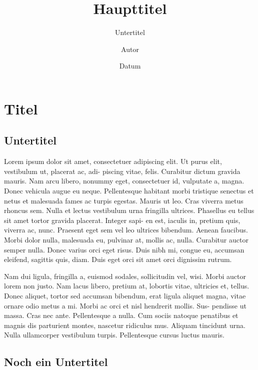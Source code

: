 \documentclass[ngerman]{uzhpub}
\begin{document}
\title{Haupttitel}

\subtitle{Untertitel}

\author{Autor}

\date{Datum}

\maketitle



\section{Titel}

\subsection{Untertitel}

Lorem ipsum dolor sit amet, consectetuer adipiscing elit. Ut purus
elit, vestibulum ut, placerat ac, adi- piscing vitae, felis. Curabitur
dictum gravida mauris. Nam arcu libero, nonummy eget, consectetuer
id, vulputate a, magna. Donec vehicula augue eu neque. Pellentesque
habitant morbi tristique senectus et netus et malesuada fames ac turpis
egestas. Mauris ut leo. Cras viverra metus rhoncus sem. Nulla et lectus
vestibulum urna fringilla ultrices. Phasellus eu tellus sit amet tortor
gravida placerat. Integer sapi- en est, iaculis in, pretium quis,
viverra ac, nunc. Praesent eget sem vel leo ultrices bibendum. Aenean
faucibus. Morbi dolor nulla, malesuada eu, pulvinar at, mollis ac,
nulla. Curabitur auctor semper nulla. Donec varius orci eget risus.
Duis nibh mi, congue eu, accumsan eleifend, sagittis quis, diam. Duis
eget orci sit amet orci dignissim rutrum. 

Nam dui ligula, fringilla a, euismod sodales, sollicitudin vel, wisi.
Morbi auctor lorem non justo. Nam lacus libero, pretium at, lobortis
vitae, ultricies et, tellus. Donec aliquet, tortor sed accumsan bibendum,
erat ligula aliquet magna, vitae ornare odio metus a mi. Morbi ac
orci et nisl hendrerit mollis. Sus- pendisse ut massa. Cras nec ante.
Pellentesque a nulla. Cum sociis natoque penatibus et magnis dis parturient
montes, nascetur ridiculus mus. Aliquam tincidunt urna. Nulla ullamcorper
vestibulum turpis. Pellentesque cursus luctus mauris. 

\subsection{Noch ein Untertitel}
\end{document}
